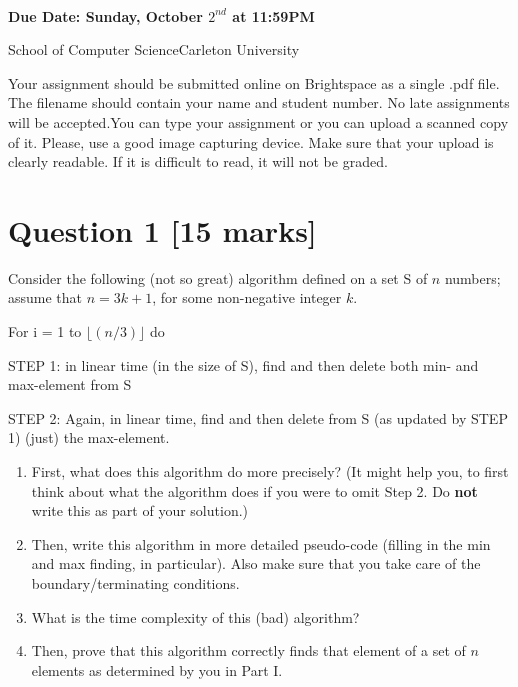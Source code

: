 \documentclass[11pt]{article}
\date{}
\begin{document}
\begin{center}
\\
\vspace{0.5cm}
{\bf Due Date: Sunday, October $2^{nd}$ at 11:59PM}
\end{center}
\noindent School of Computer Science\hfill{Carleton University}

\noindent \hrulefill

Your assignment should be submitted online on Brightspace as a single .pdf file.  The filename should contain your name and student number. No late assignments will be accepted.You can type your assignment or you can upload a scanned copy of it.  Please, use a good image capturing device. Make sure that your upload is clearly readable. If it is difficult to read, it will not be graded.

\section*{Question 1 [15 marks]}
Consider the following (not so great) algorithm defined on  a set S of $n$ numbers; assume that $n = 3k +1$, for some non-negative integer $k$. 

For i = 1 to $\lfloor (n/3) \rfloor$  do

	\indent  \indent  STEP 1:  in linear time (in the size of S), find and then delete  both min- and max-element 	\indent  \indent\indent from S
	
 	\indent  \indent STEP 2: Again, in linear time, find and then delete from S  (as updated by STEP 1) \indent  \indent\indent   (just) the max-element.
 
\begin{enumerate}[label=\Roman*.]
	\item 

 	\noindent First, what does  this algorithm do more precisely? (It might help you, to first think about what the algorithm does if you were to  omit Step 2. Do {\bf not} write this as part of your solution.)
		\item 
\noindent Then, write this algorithm in more detailed pseudo-code (filling in the min and max finding, in particular). Also make sure that you take care of the boundary/terminating conditions. 
	\item 
	What is the time complexity of this (bad) algorithm?
	\item 
\noindent   Then, prove  that  this algorithm correctly finds that element  of a set of $n$ elements as determined by you in Part I.
\end{enumerate} 	
\end{document}
